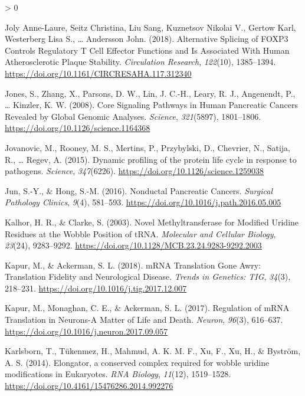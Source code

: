 \documentclass[
  12pt,
  openany]{book}
\newlength{\cslhangindent}
\newenvironment{CSLReferences}[2] %
 {%
  \setlength{\parindent}{0pt}
  \ifodd #1 \everypar{\setlength{\hangindent}{\cslhangindent}}\ignorespaces\fi
  \ifnum #2 > 0
  \setlength{\parskip}{#2\baselineskip}
  \fi
 }%
 {}
\begin{document}
\begin{CSLReferences}{1}{0}
\leavevmode\hypertarget{ref-JolyAnne-Laure2018}{}%
Joly Anne-Laure, Seitz Christina, Liu Sang, Kuznetsov Nikolai V., Gertow Karl, Westerberg Lisa S., \ldots{} Andersson John. (2018). Alternative {Splicing} of {FOXP3 Controls Regulatory T Cell Effector Functions} and {Is Associated With Human Atherosclerotic Plaque Stability}. \emph{Circulation Research}, \emph{122}(10), 1385--1394. \url{https://doi.org/10.1161/CIRCRESAHA.117.312340}

\leavevmode\hypertarget{ref-Jones2008}{}%
Jones, S., Zhang, X., Parsons, D. W., Lin, J. C.-H., Leary, R. J., Angenendt, P., \ldots{} Kinzler, K. W. (2008). Core {Signaling Pathways} in {Human Pancreatic Cancers Revealed} by {Global Genomic Analyses}. \emph{Science}, \emph{321}(5897), 1801--1806. \url{https://doi.org/10.1126/science.1164368}

\leavevmode\hypertarget{ref-Jovanovic2015}{}%
Jovanovic, M., Rooney, M. S., Mertins, P., Przybylski, D., Chevrier, N., Satija, R., \ldots{} Regev, A. (2015). Dynamic profiling of the protein life cycle in response to pathogens. \emph{Science}, \emph{347}(6226). \url{https://doi.org/10.1126/science.1259038}

\leavevmode\hypertarget{ref-Jun2016}{}%
Jun, S.-Y., \& Hong, S.-M. (2016). Nonductal {Pancreatic Cancers}. \emph{Surgical Pathology Clinics}, \emph{9}(4), 581--593. \url{https://doi.org/10.1016/j.path.2016.05.005}

\leavevmode\hypertarget{ref-Kalhor2003}{}%
Kalhor, H. R., \& Clarke, S. (2003). Novel {Methyltransferase} for {Modified Uridine Residues} at the {Wobble Position} of {tRNA}. \emph{Molecular and Cellular Biology}, \emph{23}(24), 9283--9292. \url{https://doi.org/10.1128/MCB.23.24.9283-9292.2003}

\leavevmode\hypertarget{ref-Kapur2018}{}%
Kapur, M., \& Ackerman, S. L. (2018). {mRNA Translation Gone Awry}: {Translation Fidelity} and {Neurological Disease}. \emph{Trends in Genetics: TIG}, \emph{34}(3), 218--231. \url{https://doi.org/10.1016/j.tig.2017.12.007}

\leavevmode\hypertarget{ref-Kapur2017}{}%
Kapur, M., Monaghan, C. E., \& Ackerman, S. L. (2017). Regulation of {mRNA Translation} in {Neurons}-{A Matter} of {Life} and {Death}. \emph{Neuron}, \emph{96}(3), 616--637. \url{https://doi.org/10.1016/j.neuron.2017.09.057}

\leavevmode\hypertarget{ref-Karlsborn2014}{}%
Karlsborn, T., Tükenmez, H., Mahmud, A. K. M. F., Xu, F., Xu, H., \& Byström, A. S. (2014). Elongator, a conserved complex required for wobble uridine modifications in {Eukaryotes}. \emph{RNA Biology}, \emph{11}(12), 1519--1528. \url{https://doi.org/10.4161/15476286.2014.992276}


\end{CSLReferences}
\end{document}
